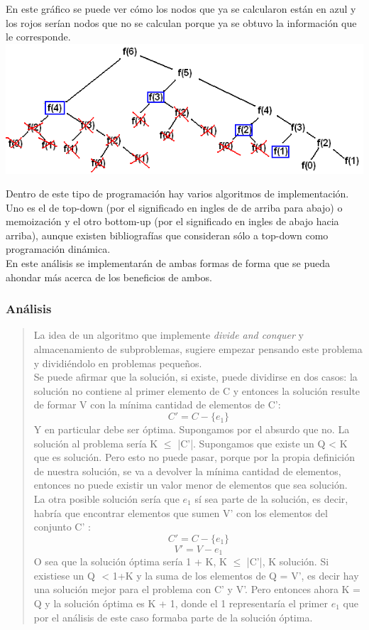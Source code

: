 \documentclass[7pt,a4paper]{article}
\begin{document}
\begin{center}
En este gráfico se puede ver cómo los nodos que ya se calcularon están en azul y los rojos serían nodos que no se calculan porque ya se obtuvo la información que le corresponde.
\includegraphics[scale=.4]{fibonacci_pd.png}
\end{center}

Dentro de este tipo de programación hay varios  algoritmos de implementación. Uno es el de top-down (por el significado en ingles de de arriba para abajo) o memoización y el otro bottom-up (por el significado en ingles de abajo hacia arriba), aunque existen bibliografías que consideran sólo a top-down como programación dinámica.
\\
En este análisis se implementarán de ambas formas de forma que se pueda ahondar más acerca de los beneficios de ambos. 
\bigskip
\subsubsection{Análisis}
\begin{verse}
La idea de un algoritmo que implemente {\it divide and conquer} y almacenamiento de subproblemas, sugiere empezar pensando este problema y dividiéndolo en problemas pequeños.\\
Se puede afirmar que la solución, si existe, puede dividirse en dos casos: la solución no contiene al primer elemento de C y entonces la solución resulte de formar V con la mínima cantidad de elementos de C': 
\[ C' = C - \{e_{1}\}\]
Y en particular debe ser óptima. Supongamos por el absurdo que no. La solución al problema sería K $\leq$ |C'|. Supongamos que existe un Q < K que es solución. Pero esto no puede pasar, porque por la propia definición de nuestra solución, se va a devolver la mínima cantidad de elementos, entonces no puede existir un valor menor de elementos que sea solución.
\\
La otra posible solución sería que $e_{1}$ sí sea parte de la solución, es decir, habría que encontrar elementos que sumen V' con los elementos del conjunto C' :
 \[ C' = C - \{e_{1}\}\]
\[ V' = V - e_{1}\]
O sea que la solución óptima sería 1 + K, K $\leq $ |C'|, K solución. Si existiese un Q $ $ < $ $1+K y la suma de los elementos de Q = V', es decir hay una solución mejor para el problema con C' y V'. Pero entonces ahora K = Q y la solución óptima es K + 1, donde el 1 representaría el primer $e_{1}$ que por el análisis de este caso formaba parte de la solución óptima.
\end{verse}
\end{document}
